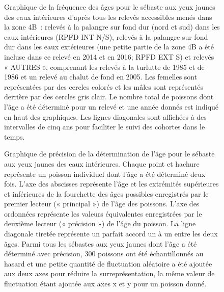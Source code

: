 \documentclass[french,11pt]{book}
\begin{document}
\begin{figure}[htb]

{\centering {} 

}

\caption{Graphique de la fréquence des âges pour le sébaste aux yeux jaunes des eaux intérieures d'après tous les relevés accessibles menés dans la zone 4B~: relevés à la palangre sur fond dur (nord et sud) dans les eaux intérieures (RPFD INT N/S), relevés à la palangre sur fond dur dans les eaux extérieures (une petite partie de la zone 4B a été incluse dans ce relevé en 2014 et en 2016; RPFD EXT S) et relevés « AUTRES », comprenant les relevés à la turlutte de 1985 et de 1986 et un relevé au chalut de fond en 2005. Les femelles sont représentées par des cercles colorés et les mâles sont représentés derrière par des cercles gris clair. Le nombre total de poissons dont l'âge a été déterminé pour un relevé et une année donnés est indiqué en haut des graphiques. Les lignes diagonales sont affichées à des intervalles de cinq ans pour faciliter le suivi des cohortes dans le temps.}\label{fig:age-freq}
\end{figure}

\begin{figure}[htb]

{\centering {} 

}

\caption{Graphique de précision de la détermination de l'âge pour le sébaste aux yeux jaunes des eaux intérieures. Chaque point et hachure représente un poisson individuel dont l'âge a été déterminé deux fois. L'axe des abscisses représente l'âge et les extrémités supérieures et inférieures de la fourchette des âges possibles enregistrés par le premier lecteur (« principal ») de l'âge des poissons. L'axe des ordonnées représente les valeurs équivalentes enregistrées par le deuxième lecteur (« précision ») de l'âge du poisson. La ligne diagonale tiretée représente un parfait accord un à un entre les deux âges. Parmi tous les sébastes aux yeux jaunes dont l'âge a été déterminé avec précision, 300 poissons ont été échantillonnés au hasard et une petite quantité de fluctuation aléatoire a été ajoutée aux deux axes pour réduire la surreprésentation, la même valeur de fluctuation étant ajoutée aux axes x et y pour un poisson donné.}\label{fig:age-precision}
\end{figure}
\end{document}
